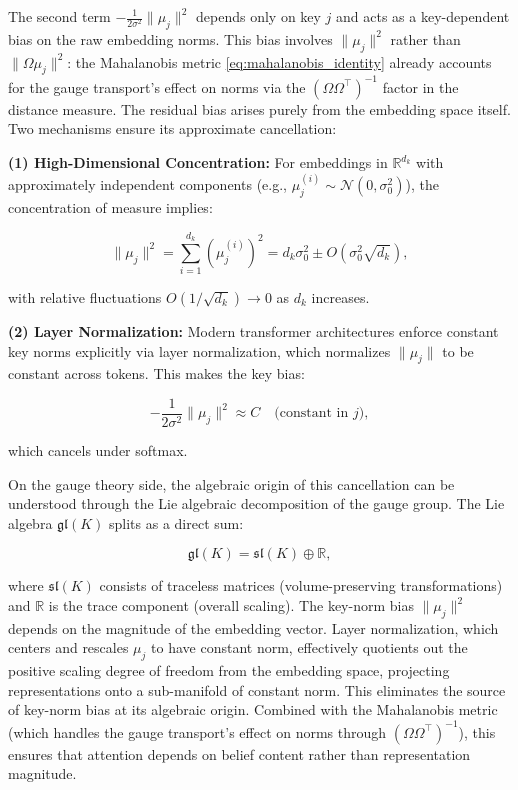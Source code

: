 \documentclass[twoside,11pt]{article}
\begin{document}
The second term $-\frac{1}{2\sigma^2}\|\mu_j\|^2$ depends only on key $j$ and acts as a key-dependent bias on the raw embedding norms. This bias involves $\|\mu_j\|^2$ rather than $\|\Omega\mu_j\|^2$: the Mahalanobis metric \eqref{eq:mahalanobis_identity} already accounts for the gauge transport's effect on norms via the $(\Omega\Omega^\top)^{-1}$ factor in the distance measure. The residual bias arises purely from the embedding space itself. Two mechanisms ensure its approximate cancellation:

\textbf{(1) High-Dimensional Concentration:}
For embeddings in $\mathbb{R}^{d_k}$ with approximately independent components (e.g., $\mu_j^{(i)} \sim \mathcal{N}(0, \sigma_0^2)$), the concentration of measure implies:

\begin{equation}
\|\mu_j\|^2 = \sum_{i=1}^{d_k} (\mu_j^{(i)})^2 = d_k\sigma_0^2 \pm O(\sigma_0^2\sqrt{d_k}),
\end{equation}

with relative fluctuations $O(1/\sqrt{d_k}) \to 0$ as $d_k$ increases.

\textbf{(2) Layer Normalization:}
Modern transformer architectures enforce constant key norms explicitly via layer normalization, which normalizes $\|\mu_j\|$ to be constant across tokens. This makes the key bias:

\begin{equation}
-\frac{1}{2\sigma^2}\|\mu_j\|^2 \approx C \quad \text{(constant in } j\text{)},
\end{equation}

which cancels under softmax.

On the gauge theory side, the algebraic origin of this cancellation can be understood through the Lie algebraic decomposition of the gauge group. The Lie algebra $\mathfrak{gl}(K)$ splits as a direct sum:

\begin{equation}
\mathfrak{gl}(K) = \mathfrak{sl}(K) \oplus \mathbb{R},
\label{eq:gl_decomposition}
\end{equation}

where $\mathfrak{sl}(K)$ consists of traceless matrices (volume-preserving transformations) and $\mathbb{R}$ is the trace component (overall scaling). The key-norm bias $\|\mu_j\|^2$ depends on the magnitude of the embedding vector. Layer normalization, which centers and rescales $\mu_j$ to have constant norm, effectively quotients out the positive scaling degree of freedom from the embedding space, projecting representations onto a sub-manifold of constant norm. This eliminates the source of key-norm bias at its algebraic origin. Combined with the Mahalanobis metric (which handles the gauge transport's effect on norms through $(\Omega\Omega^\top)^{-1}$), this ensures that attention depends on belief content rather than representation magnitude.
\end{document}
